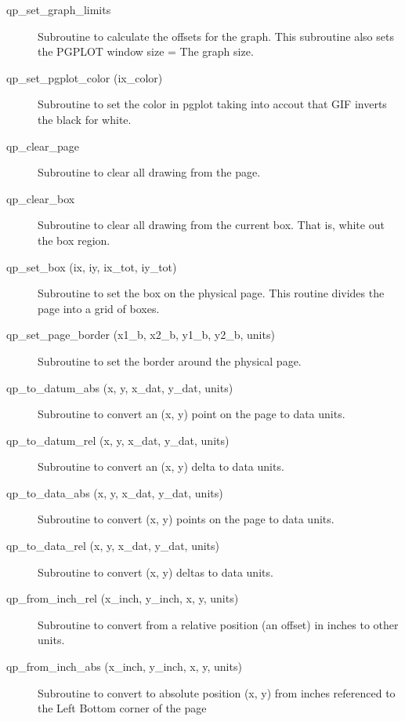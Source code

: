 \begin{description}
\item[qp\_set\_graph\_limits] \Newline 
     Subroutine to calculate the offsets for the graph.
     This subroutine also sets the PGPLOT window size = The graph size.

\item[qp\_set\_pgplot\_color (ix\_color)  ] \Newline 
     Subroutine to set the color in pgplot taking into accout that GIF
     inverts the black for white.

\item[qp\_clear\_page] \Newline 
     Subroutine to clear all drawing from the page.

\item[qp\_clear\_box] \Newline 
     Subroutine to clear all drawing from the current box.
     That is, white out the box region.

\item[qp\_set\_box (ix, iy, ix\_tot, iy\_tot)] \Newline 
     Subroutine to set the box on the physical page.
     This routine divides the page into a grid of boxes. 

\item[qp\_set\_page\_border (x1\_b, x2\_b, y1\_b, y2\_b, units)] \Newline 
     Subroutine to set the border around the physical page.

\item[qp\_to\_datum\_abs (x, y, x\_dat, y\_dat, units)] \Newline 
     Subroutine to convert an (x, y) point on the page to data units.

\item[qp\_to\_datum\_rel (x, y, x\_dat, y\_dat, units)] \Newline 
     Subroutine to convert an (x, y) delta to data units.

\item[qp\_to\_data\_abs (x, y, x\_dat, y\_dat, units)] \Newline 
     Subroutine to convert (x, y) points on the page to data units.

\item[qp\_to\_data\_rel (x, y, x\_dat, y\_dat, units)] \Newline 
     Subroutine to convert (x, y) deltas to data units.

\item[qp\_from\_inch\_rel (x\_inch, y\_inch, x, y, units)] \Newline 
     Subroutine to convert from a relative position (an offset) in inches
     to other units.

\item[qp\_from\_inch\_abs (x\_inch, y\_inch, x, y, units)] \Newline 
     Subroutine to convert to absolute position (x, y) from inches referenced
     to the Left Bottom corner of the page


\end{description}
